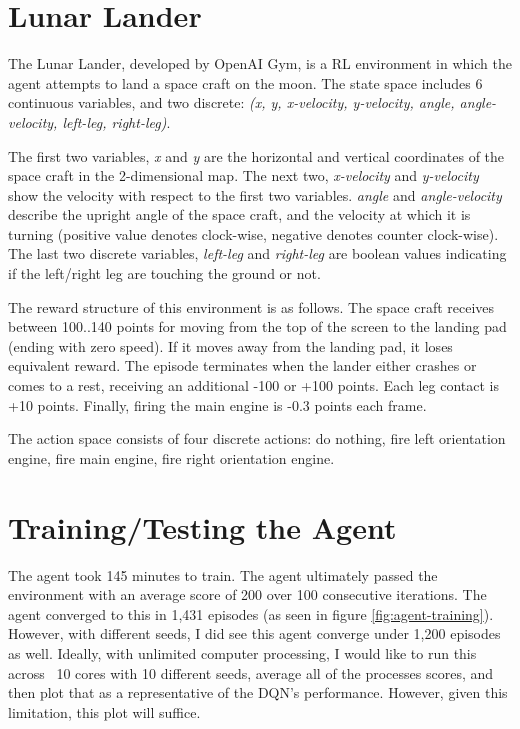 \documentclass[conference]{IEEEtran}
\begin{document}
\section{Lunar Lander}
The Lunar Lander, developed by OpenAI Gym, is a RL environment in which the agent attempts to land a space craft on the moon. The state space includes 6 continuous variables, and two discrete: \textit{(x, y, x-velocity, y-velocity, angle, angle-velocity, left-leg, right-leg)}.

The first two variables, \textit{x} and \textit{y} are the horizontal and vertical coordinates of the space craft in the 2-dimensional map. The next two, \textit{x-velocity} and \textit{y-velocity} show the velocity with respect to the first two variables. \textit{angle} and \textit{angle-velocity} describe the upright angle of the space craft, and the velocity at which it is turning (positive value denotes clock-wise, negative denotes counter clock-wise). The last two discrete variables, \textit{left-leg} and \textit{right-leg} are boolean values indicating if the left/right leg are touching the ground or not.

The reward structure of this environment is as follows. The space craft receives between 100..140 points for moving from the top of the screen to the landing pad (ending with zero speed). If it moves away from the landing pad, it loses equivalent reward. The episode terminates when the lander either crashes or comes to a rest, receiving an additional -100 or +100 points. Each leg contact is +10 points. Finally, firing the main engine is -0.3 points each frame.

The action space consists of four discrete actions: do nothing, fire left orientation engine, fire main engine, fire right orientation engine.

\section{Training/Testing the Agent}
The agent took 145 minutes to train. The agent ultimately passed the environment with an average score of 200 over 100 consecutive iterations. The agent converged to this in 1,431 episodes (as seen in figure \ref{fig:agent-training}). However, with different seeds, I did see this agent converge under 1,200 episodes as well. Ideally, with unlimited computer processing, I would like to run this across ~10 cores with 10 different seeds, average all of the processes scores, and then plot that as a representative of the DQN's performance. However, given this limitation, this plot will suffice.
\end{document}
